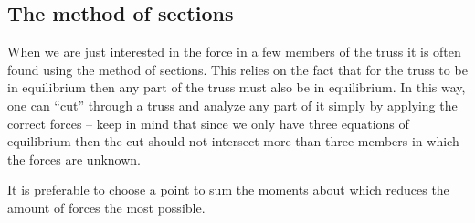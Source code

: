 
\subsection{The method of sections}
When we are just interested in the force in a few members of the truss it is often found using the method of sections. This relies on the fact that for the truss to be in equilibrium then any part of the truss must also be in equilibrium. In this way, one can ``cut'' through a truss and analyze any part of it simply by applying the correct forces -- keep in mind that since we only have three equations of equilibrium then the cut should not intersect more than three members in which the forces are unknown. 

It is preferable to choose a point to sum the moments about which reduces the amount of forces the most possible. 
